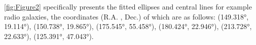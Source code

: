 \documentclass{aa}
\begin{document}
\autoref{fig:Figure2} specifically presents the fitted ellipses and central lines for example radio galaxies, the coordinates (R.A. , Dec.) of which are as follows: (149.318°, 19.114°), (150.738°, 19.865°), (175.545°, 55.458°), (180.424°, 22.946°), (213.728°, 22.633°), (125.391°, 47.043°).




\end{document}
